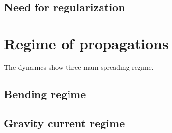 \subsection{Need for regularization}
\label{C2-sec:need-regularization}


\section{Regime of propagations}
\label{C2-sec:regime-propagations}

The dynamics show three main spreading regime.

\subsection{Bending regime}
\label{C2-sec:bending-regime}

\subsection{Gravity current regime}
\label{C2-sec:grav-curr-regime}



